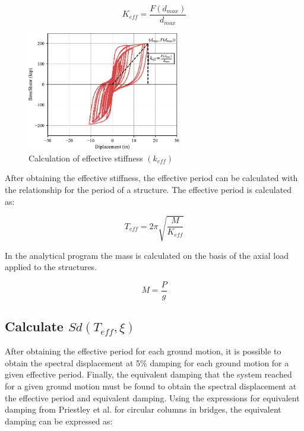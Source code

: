 \begin{equation}
     K_{eff}=\frac{F(d_{max})}{d_{max}}
    \label{eq:Keff_calcualtion}
\end{equation}

\begin{figure}[htbp]
	\centering
	\includegraphics[width=0.60\textwidth]{VAC Thesis 2.0/Chapter-5/figs/Force_Diplacement_Keff_Calc.pdf}
	\caption{Calculation of effective stiffness $(k_{eff})$}
	\label{fig:k_eff_calculation}
\end{figure}

After obtaining the effective stiffness, the effective period can be calculated with the relationship for the period of a structure. The effective period is calculated as:

\begin{equation}
     T_{eff}=2\pi \sqrt{\frac{M}{K_{eff}}}
    \label{eq:Teff_calcualtion}
\end{equation}

In the analytical program the mass is calculated on the basis of the axial load applied to the structures. 

\begin{equation}
    M=\frac{P}{g}
    \label{eq:M_calcualtion}
\end{equation}

\subsection{Calculate $Sd(T_{eff},\xi)$}

After obtaining the effective period for each ground motion, it is possible to obtain the spectral displacement at 5\% damping for each ground motion for a given effective period. Finally, the equivalent damping that the system reached for a given ground motion must be found to obtain the spectral displacement at the effective period and equivalent damping. Using the expressions for equivalent damping from Priestley et al. for circular columns in bridges, the equivalent damping can be expressed as:

